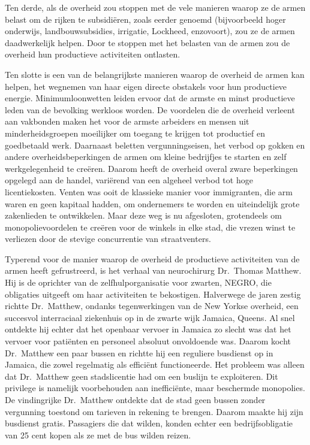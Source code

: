 \documentclass[
  a5paper,
  smalldemyvopaper,10pt,twoside,onecolumn,openright,extrafontsizes,hidelinks]{memoir}
\begin{document}
Ten derde, als de overheid zou stoppen met de vele manieren waarop ze de
armen belast om de rijken te subsidiëren, zoals eerder genoemd
(bijvoorbeeld hoger onderwijs, landbouwsubsidies, irrigatie, Lockheed,
enzovoort), zou ze de armen daadwerkelijk helpen. Door te stoppen met
het belasten van de armen zou de overheid hun productieve activiteiten
ontlasten.

Ten slotte is een van de belangrijkste manieren waarop de overheid de
armen kan helpen, het wegnemen van haar eigen directe obstakels voor hun
productieve energie. Minimumloonwetten leiden ervoor dat de armste en
minst productieve leden van de bevolking werkloos worden. De voordelen
die de overheid verleent aan vakbonden maken het voor de armste
arbeiders en mensen uit minderheidsgroepen moeilijker om toegang te
krijgen tot productief en goedbetaald werk. Daarnaast beletten
vergunningseisen, het verbod op gokken en andere overheidsbeperkingen de
armen om kleine bedrijfjes te starten en zelf werkgelegenheid te
creëren. Daarom heeft de overheid overal zware beperkingen opgelegd aan
de handel, variërend van een algeheel verbod tot hoge licentiekosten.
Venten was ooit de klassieke manier voor immigranten, die arm waren en
geen kapitaal hadden, om ondernemers te worden en uiteindelijk grote
zakenlieden te ontwikkelen. Maar deze weg is nu afgesloten, grotendeels
om monopolievoordelen te creëren voor de winkels in elke stad, die
vrezen winst te verliezen door de stevige concurrentie van
straatventers.

Typerend voor de manier waarop de overheid de productieve activiteiten
van de armen heeft gefrustreerd, is het verhaal van neurochirurg
Dr.~Thomas Matthew. Hij is de oprichter van de zelfhulporganisatie voor
zwarten, NEGRO, die obligaties uitgeeft om haar activiteiten te
bekostigen. Halverwege de jaren zestig richtte Dr.~Matthew, ondanks
tegenwerkingen van de New Yorkse overheid, een succesvol interraciaal
ziekenhuis op in de zwarte wijk Jamaica, Queens. Al snel ontdekte hij
echter dat het openbaar vervoer in Jamaica zo slecht was dat het vervoer
voor patiënten en personeel absoluut onvoldoende was. Daarom kocht
Dr.~Matthew een paar bussen en richtte hij een reguliere busdienst op in
Jamaica, die zowel regelmatig als efficiënt functioneerde. Het probleem
was alleen dat Dr.~Matthew geen stadslicentie had om een buslijn te
exploiteren. Dit privilege is namelijk voorbehouden aan inefficiënte,
maar beschermde monopolies. De vindingrijke Dr.~Matthew ontdekte dat de
stad geen bussen zonder vergunning toestond om tarieven in rekening te
brengen. Daarom maakte hij zijn busdienst gratis. Passagiers die dat
wilden, konden echter een bedrijfsobligatie van 25 cent kopen als ze met
de bus wilden reizen.
\end{document}

